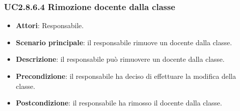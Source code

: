 \subsubsection{UC2.8.6.4 Rimozione docente dalla classe}
\begin{itemize}
\item \textbf{Attori}: Responsabile.
\item \textbf{Scenario principale}: il responsabile rimuove un docente dalla classe.
\item \textbf{Descrizione}: il responsabile può rimuovere un docente dalla classe.
\item \textbf{Precondizione}: il responsabile ha deciso di effettuare la modifica della classe.
\item \textbf{Postcondizione}: il responsabile ha rimosso il docente dalla classe.
\end{itemize}

